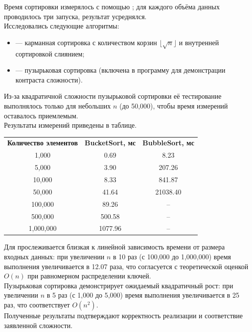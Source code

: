 \documentclass[12pt]{article}
\begin{document}
Время сортировки измерялось с помощью ; для каждого объёма данных проводилось три запуска, результат усреднялся. \\

Исследовались следующие алгоритмы:
\begin{itemize}
\item {} — карманная сортировка с количеством корзин $\lfloor\sqrt{n}\rfloor$ и внутренней сортировкой слиянием;
\item {} — пузырьковая сортировка (включена в программу для демонстрации контраста сложности).
\end{itemize}
Из-за квадратичной сложности пузырьковой сортировки её тестирование выполнялось только для небольших $n$ (до 50,000), чтобы время измерений оставалось приемлемым. \\

Результаты измерений приведены в таблице.

\begin{center}
\begin{tabular}{|c|c|c|}
\hline
\textbf{Количество элементов} & \textbf{BucketSort, мс} & \textbf{BubbleSort, мс} \\
1,000 & 0.69 & 8.23 \\
5,000 & 3.90 & 207.26 \\
10,000 & 8.33 & 841.87 \\
50,000 & 41.64 & 21038.40 \\
100,000 & 89.26 & – \\
500,000 & 500.58 & – \\
1,000,000 & 1077.96 & – \\
\hline
\end{tabular}
\end{center}

Для  прослеживается близкая к линейной зависимость времени от размера входных данных: при увеличении $n$ в 10 раз (с 100,000 до 1,000,000) время выполнения увеличивается в 12.07 раза, что согласуется с теоретической оценкой $O(n)$ при равномерном распределении ключей.  \\

Пузырьковая сортировка демонстрирует ожидаемый квадратичный рост: при увеличении $n$ в 5 раз (с 1,000 до 5,000) время выполнения увеличивается в 25 раз, что соответствует $O(n^2)$. \\

Полученные результаты подтверждают корректность реализации и соответствие заявленной сложности.
\end{document}
